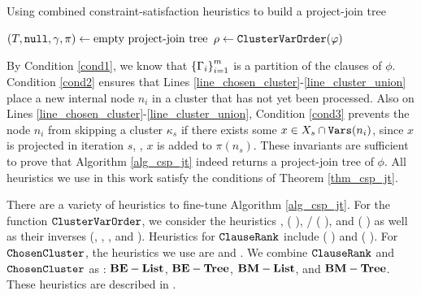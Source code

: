 \begin{algorithm*}[t]
\label{alg_csp_jt}
\caption{Using combined constraint-satisfaction heuristics to build a project-join tree}
    \DontPrintSemicolon
    $(T, \texttt{\upshape null}, \gamma, \pi) \gets \text{empty project-join tree}$\;
    $\rho \gets \texttt{\upshape ClusterVarOrder}(\varphi)$
\end{algorithm*}

By Condition \ref{cond1}, we know that $\left\{ \Gamma_i \right\}_{i = 1}^m$ is a partition of the clauses of $\phi$.
Condition \ref{cond2} ensures that Lines \ref{line_chosen_cluster}-\ref{line_cluster_union} place a new internal node $n_i$ in a cluster that has not yet been processed.
Also on Lines \ref{line_chosen_cluster}-\ref{line_cluster_union}, Condition \ref{cond3} prevents the node $n_i$ from skipping a cluster $\kappa_s$ if there exists some $x \in X_s \cap \texttt{\upshape Vars}(n_i)$, since $x$ is projected in iteration $s$, \ie, $x$ is added to $\pi(n_s)$.
These invariants are sufficient to prove that Algorithm \ref{alg_csp_jt} indeed returns a project-join tree of $\phi$.
All heuristics we use in this work satisfy the conditions of Theorem \ref{thm_csp_jt}.

There are a variety of heuristics to fine-tune Algorithm \ref{alg_csp_jt}.
For the function $\texttt{\upshape ClusterVarOrder}$, we consider the heuristics \Random, \Mcs{} ( \cite{tarjan1984simple}), \Lexp/\Lexm{} ( \cite{koster2001treewidth}), and \Minfill{} ( \cite{dechter2003constraint}) as well as their inverses (\Invmcs, \Invlexp, \Invlexm, and \Invminfill).
Heuristics for $\texttt{\upshape ClauseRank}$ include \Be{} ( \cite{dechter1999bucket}) and \Bm{} ( \cite{bouquet1999gestion}).
For $\texttt{\upshape ChosenCluster}$, the heuristics we use are \ListH{} and \TreeH{} \cite{dudek2020addmc}.
We combine $\texttt{\upshape ClauseRank}$ and $\texttt{\upshape ChosenCluster}$ as : $\textbf{BE}-\textbf{List}$, $\textbf{BE}-\textbf{Tree}$, $\textbf{BM}-\textbf{List}$, and $\textbf{BM}-\textbf{Tree}$.
These heuristics are described in \cite{dudek2020addmc}%
.

